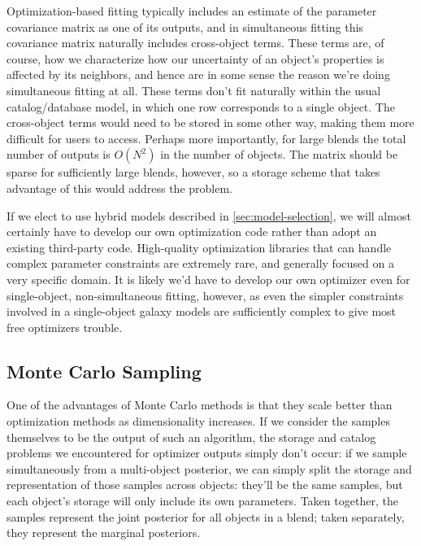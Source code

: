 \documentclass[10pt]{article}
\begin{document}
Optimization-based fitting typically includes an estimate of the parameter
covariance matrix as one of its outputs, and in simultaneous fitting this
covariance matrix naturally includes cross-object terms.  These terms are, of
course, how we characterize how our uncertainty of an object's properties is
affected by its neighbors, and hence are in some sense the reason we're doing
simultaneous fitting at all.  These terms don't fit naturally within the
usual catalog/database model, in which one row corresponds to a single object.
The cross-object terms would need to be stored in some other way, making them
more difficult for users to access.  Perhaps more importantly, for large
blends the total number of outputs is $O(N^2)$ in the number of objects.  The
matrix should be sparse for sufficiently large blends, however, so a storage
scheme that takes advantage of this would address the problem.

If we elect to use hybrid models described in \ref{sec:model-selection}, we
will almost certainly have to develop our own optimization code rather than
adopt an existing third-party code.  High-quality optimization libraries that
can handle complex parameter constraints are extremely rare, and generally
focused on a very specific domain.  It is likely we'd have to develop our own
optimizer even for single-object, non-simultaneous fitting, however, as even
the simpler constraints involved in a single-object galaxy models are
sufficiently complex to give most free optimizers trouble.

\subsection{Monte Carlo Sampling}

One of the advantages of Monte Carlo methods is that they scale better than
optimization methods as dimensionality increases.  If we consider the samples
themselves to be the output of such an algorithm, the storage and catalog
problems we encountered for optimizer outputs simply don't occur: if we sample
simultaneously from a multi-object posterior, we can simply split the storage
and representation of those samples across objects: they'll be the same
samples, but each object's storage will only include its own parameters.
Taken together, the samples represent the joint posterior for all objects in
a blend; taken separately, they represent the marginal posteriors.
\end{document}
